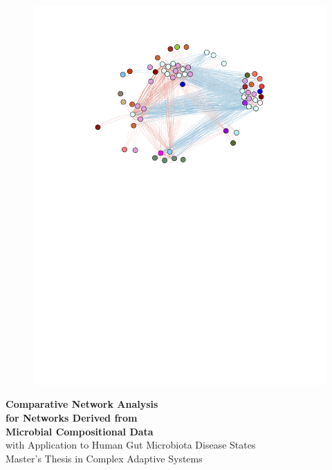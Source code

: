 
\begin{titlepage}
			
\addtolength{\voffset}{2cm}

\newcommand{\thesistitle}{Comparative Network Analysis \\ for Networks Derived from \\ Microbial Compositional Data}

\newcommand{\thesissubtitle}{with Application to Human Gut Microbiota Disease States}

\begin{figure}[H]
\centering
\vspace{1cm}	%
\includegraphics[width=.9\linewidth]{figure/cover/cutoff_0_08_wgcna_h_cover.pdf}
\end{figure}

\vspace*{-2.5cm}
\vfill
\renewcommand{\familydefault}{\sfdefault} \normalfont %
\textbf{{\Huge \thesistitle}} 	\\[0.5cm]
{\Large \thesissubtitle}\\[0.5cm]
Master's Thesis in Complex Adaptive Systems \setlength{\parskip}{1cm}


\end{titlepage}
